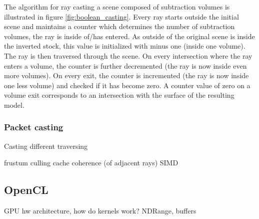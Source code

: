 The algorithm for ray casting a scene composed of subtraction volumes is illustrated in figure \ref{fig:boolean_casting}. Every ray starts outside the initial scene and maintains a counter which determines the number of subtraction volumes, the ray is inside of/has entered. As outside of the original scene is inside the inverted stock, this value is initialized with minus one (inside one volume). The ray is then traversed through the scene. On every intersection where the ray enters a volume, the counter is further decremented (the ray is now inside even more volumes). On every exit, the counter is incremented (the ray is now inside one less volume) and checked if it has become zero. A counter value of zero on a volume exit corresponds to an intersection with the surface of the resulting model.

\subsubsection{Packet casting}

Casting 
different traversing

frustum culling
cache coherence (of adjacent rays)
SIMD




\subsection{OpenCL}

GPU hw architecture, how do kernels work? NDRange, buffers
